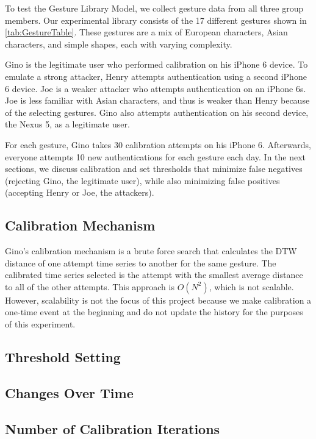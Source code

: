 To test the Gesture Library Model, we collect gesture data from all three group members. Our experimental library consists of the 17 different gestures shown in \autoref{tab:GestureTable}. These gestures are a mix of European characters, Asian characters, and simple shapes, each with varying complexity. 

Gino is the legitimate user who performed calibration on his iPhone 6 device. To emulate a strong attacker, Henry attempts authentication using a second iPhone 6 device. Joe is a weaker attacker who attempts authentication on an iPhone 6s. Joe is less familiar with Asian characters, and thus is weaker than Henry because of the selecting gestures. Gino also attempts authentication on his second device, the Nexus 5, as a legitimate user.

For each gesture, Gino takes 30 calibration attempts on his iPhone 6. Afterwards, everyone attempts 10 new authentications for each gesture each day. In the next sections, we discuss calibration and set thresholds that minimize false negatives (rejecting Gino, the legitimate user), while also minimizing false positives (accepting Henry or Joe, the attackers).

\subsection{Calibration Mechanism}

Gino's calibration mechanism is a brute force search that calculates the \gls{DTW} distance of one attempt time series to another for the same gesture. The calibrated time series selected is the attempt with the smallest average distance to all of the other attempts. This approach is $O(N^{2})$, which is not scalable. However, scalability is not the focus of this project because we make calibration a one-time event at the beginning and do not update the history for the purposes of this experiment.

\subsection{Threshold Setting}

\subsection{Changes Over Time}

\subsection{Number of Calibration Iterations}


